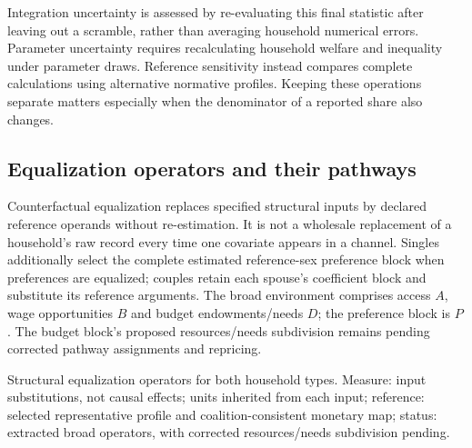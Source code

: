 \documentclass[11pt,a4paper]{article}
\begin{document}
Integration uncertainty is assessed by re-evaluating this final statistic after leaving out a scramble, rather than averaging household numerical errors. Parameter uncertainty requires recalculating household welfare and inequality under parameter draws. Reference sensitivity instead compares complete calculations using alternative normative profiles. Keeping these operations separate matters especially when the denominator of a reported share also changes.

\subsection{Equalization operators and their pathways}\label{equalization-operators-and-their-pathways}

Counterfactual equalization replaces specified structural inputs by declared reference operands without re-estimation. It is not a wholesale replacement of a household's raw record every time one covariate appears in a channel. Singles additionally select the complete estimated reference-sex preference block when preferences are equalized; couples retain each spouse's coefficient block and substitute its reference arguments. The broad environment comprises access \(A\), wage opportunities \(B\) and budget endowments/needs \(D\); the preference block is \(P\). The budget block's proposed resources/needs subdivision remains pending corrected pathway assignments and repricing.

Structural equalization operators for both household types. Measure: input substitutions, not causal effects; units inherited from each input; reference: selected representative profile and coalition-consistent monetary map; status: extracted broad operators, with corrected resources/needs subdivision pending.
\end{document}
